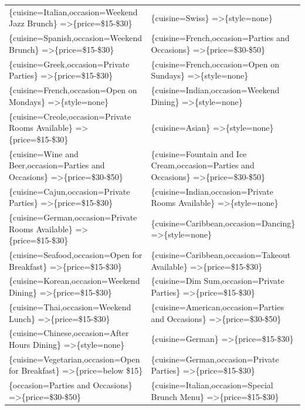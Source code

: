 \documentclass[letterpaper,10pt]{article}
\begin{document}
\begin{appendices}
\begin{table}[h]
\begin{adjustbox}{max width=\textwidth}
\begin{tabular}{ll}
\{cuisine=Italian,occasion=Weekend Jazz Brunch\} =\textgreater \{price=\$15-\$30\} & \{cuisine=Swiss\} =\textgreater \{style=none\} \\ 
\{cuisine=Spanish,occasion=Weekend Brunch\} =\textgreater \{price=\$15-\$30\} & \{cuisine=French,occasion=Parties and Occasions\} =\textgreater \{price=\$30-\$50\} \\ 
\{cuisine=Greek,occasion=Private Parties\} =\textgreater \{price=\$15-\$30\} & \{cuisine=French,occasion=Open on Sundays\} =\textgreater \{style=none\} \\ 
\{cuisine=French,occasion=Open on Mondays\} =\textgreater \{style=none\} & \{cuisine=Indian,occasion=Weekend Dining\} =\textgreater \{style=none\} \\ 
\{cuisine=Creole,occasion=Private Rooms Available\} =\textgreater \{price=\$15-\$30\} & \{cuisine=Asian\} =\textgreater \{style=none\} \\ 
\{cuisine=Wine and Beer,occasion=Parties and Occasions\} =\textgreater \{price=\$30-\$50\} & \{cuisine=Fountain and Ice Cream,occasion=Parties and Occasions\} =\textgreater \{price=\$30-\$50\} \\ 
\{cuisine=Cajun,occasion=Private Parties\} =\textgreater \{price=\$15-\$30\} & \{cuisine=Indian,occasion=Private Rooms Available\} =\textgreater \{style=none\} \\ 
\{cuisine=German,occasion=Private Rooms Available\} =\textgreater \{price=\$15-\$30\} & \{cuisine=Caribbean,occasion=Dancing\} =\textgreater \{style=none\} \\ 
\{cuisine=Seafood,occasion=Open for Breakfast\} =\textgreater \{price=\$15-\$30\} & \{cuisine=Caribbean,occasion=Takeout Available\} =\textgreater \{price=\$15-\$30\} \\ 
\{cuisine=Korean,occasion=Weekend Dining\} =\textgreater \{price=\$15-\$30\} & \{cuisine=Dim Sum,occasion=Private Parties\} =\textgreater \{price=\$15-\$30\} \\ 
\{cuisine=Thai,occasion=Weekend Lunch\} =\textgreater \{price=\$15-\$30\} & \{cuisine=American,occasion=Parties and Occasions\} =\textgreater \{price=\$30-\$50\} \\ 
\{cuisine=Chinese,occasion=After Hours Dining\} =\textgreater \{style=none\} & \{cuisine=German\} =\textgreater \{price=\$15-\$30\} \\ 
\{cuisine=Vegetarian,occasion=Open for Breakfast\} =\textgreater \{price=below \$15\} & \{cuisine=German,occasion=Private Parties\} =\textgreater \{price=\$15-\$30\} \\ 
\{occasion=Parties and Occasions\} =\textgreater \{price=\$30-\$50\} & \{cuisine=Italian,occasion=Special Brunch Menu\} =\textgreater \{price=\$15-\$30\} \\ 

\end{tabular}
\end{adjustbox}
\end{table}
\end{appendices}
\end{document}
